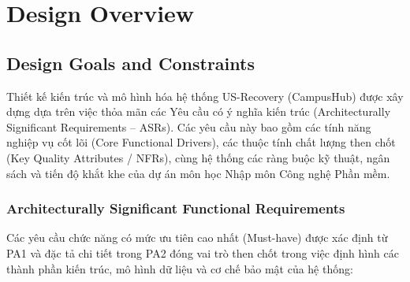 \section{Design Overview}\label{design-overview}

\subsection{Design Goals and Constraints}\label{design-goals-and-constraints}

Thiết kế kiến trúc và mô hình hóa hệ thống US-Recovery (CampusHub) được xây dựng dựa trên việc thỏa mãn các Yêu cầu có ý nghĩa kiến trúc (Architecturally Significant Requirements -- ASRs). Các yêu cầu này bao gồm các tính năng nghiệp vụ cốt lõi (Core Functional Drivers), các thuộc tính chất lượng then chốt (Key Quality Attributes / NFRs), cùng hệ thống các ràng buộc kỹ thuật, ngân sách và tiến độ khắt khe của dự án môn học Nhập môn Công nghệ Phần mềm.

\subsubsection{Architecturally Significant Functional Requirements}

Các yêu cầu chức năng có mức ưu tiên cao nhất (Must-have) được xác định từ PA1 và đặc tả chi tiết trong PA2 đóng vai trò then chốt trong việc định hình các thành phần kiến trúc, mô hình dữ liệu và cơ chế bảo mật của hệ thống:

